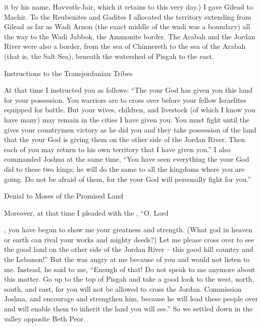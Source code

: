 {it by his name,
Havvoth-Jair,
which it retains to
this
very
day.)
I gave
Gilead
to Machir.
To the Reubenites
and Gadites
I allocated
the territory extending from
Gilead
as far
as Wadi
Arnon
(the exact middle
of the wadi
was a boundary) all
the way
to the Wadi
Jabbok,
the Ammonite
border.
The Arabah
and the Jordan River
were also a border,
from the sea of Chinnereth
to
the sea
of the Arabah
(that is, the Salt
Sea), beneath
the watershed
of Pisgah
to the east.
\par }{\SH Instructions to the Transjordanian Tribes
\par }{\PP {}At that time
I instructed
you as follows: “The
{}
your God
has given
you this
land
for your possession.
You warriors
are to cross
over before
your fellow
Israelites
equipped for battle.
But
your wives,
children,
and livestock
(of which I know
you have many) may remain
in the cities
I have
given you.
You must fight until
the {}
gives
your countrymen
victory
as he did
you and they
take possession
of the land
that
the {}
your God
is giving
them
on the other side
of the Jordan River.
Then each
of you may return
to his own territory
that
I have given you.”
I also
commanded
Joshua
at the same time,
“You have seen
everything
the {}
your God
did
to these
two
kings;
he will do
the same
to all
the kingdoms
where
you
are going.
Do not
be afraid
of them, for
the {}
your God
will personally fight for you.”
\par }{\SH Denial to Moses of the Promised Land
\par }{\PP {}Moreover, at that time
I pleaded
with the
{},
“O, Lord

{}, you
have begun
to show
me
your greatness
and strength.
(What
god
in heaven
or earth
can
rival your works
and mighty deeds?)
Let me please
cross
over to see
the good
land
on the other side
of the Jordan River
– this
good
hill country
and the Lebanon!”
But the
{}
was angry
at me because
of you and would not
listen
to me.
Instead, he said
to
me, “Enough
of that! Do not
speak
to me
anymore
about this
matter.
Go up
to the top
of Pisgah
and take
a good look
to the west,
north,
south,
and east,
for
you will not
be allowed to cross
the
Jordan.
Commission
Joshua,
and encourage
and strengthen
him, because
he will lead
these
people
over and will enable them to inherit
the land
you will see.”
So we settled
down in the valley
opposite
Beth Peor.

}
